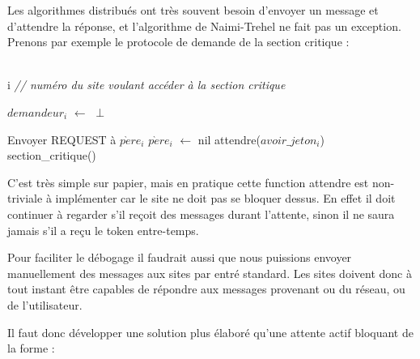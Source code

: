 Les algorithmes distribués ont très souvent besoin d'envoyer un message et d'attendre la réponse, et l'algorithme de Naimi-Trehel ne fait pas un exception. Prenons par exemple le protocole de demande de la section critique :

\begin{algorithm}[H]
  \caption{$Demander_i$()}
  \Donnees
  {\\
    i \textit{// numéro du site voulant accéder à la section critique}\\
  }
  \Deb
  {
  	$demandeur_i$ $\leftarrow$ $\perp$ \;
  	
  	{
  		Envoyer REQUEST à $p\grave{e}re_i$ \;
  		$p\grave{e}re_i$ $\leftarrow$ nil \;
  	}
	attendre($avoir\_jeton_i$) \;
  	section\_critique() \;

  }	
\end{algorithm}

C'est très simple sur papier, mais en pratique cette function \og attendre \fg{} est non-triviale à implémenter car le site ne doit pas se bloquer dessus. En effet il doit continuer à regarder s'il reçoit des messages durant l'attente, sinon il ne saura jamais s'il a reçu le token entre-temps.

Pour faciliter le débogage il faudrait aussi que nous puissions envoyer manuellement des messages aux sites par entré standard. Les sites doivent donc à tout instant être capables de répondre aux messages provenant ou du réseau, ou de l'utilisateur.
 
Il faut donc développer une solution plus élaboré qu'une attente actif bloquant de la forme :

 